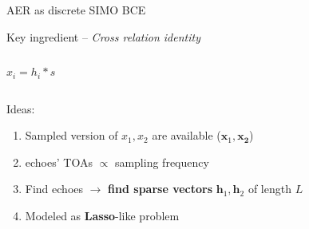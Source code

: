 \begin{frame}{AER as discrete SIMO BCE}

    \begin{block}{Key ingredient -- \textit{Cross relation identity}}
        \begin{columns}[onlytextwidth]
            \[
                x_i = h_i \ast s
            \]

            \centering
        \end{columns}
    \end{block}

    \vspace*{-1em}
    \pause[3]

    \begin{block}{Ideas:}
    \begin{enumerate}
        \item Sampled version of $x_1,x_2$ are available ($\mathbf{x}_1, \mathbf{x_2}$)
        \pause
        \item echoes' TOAs $\propto$ sampling frequency
        \pause
        \item Find echoes $\rightarrow$ \textbf{find sparse vectors} $\mathbf{h}_1, \mathbf{h}_2$ of length $L$
        \pause
        \item Modeled as \textbf{Lasso}-like problem


\end{enumerate}
\end{block}
\end{frame}
